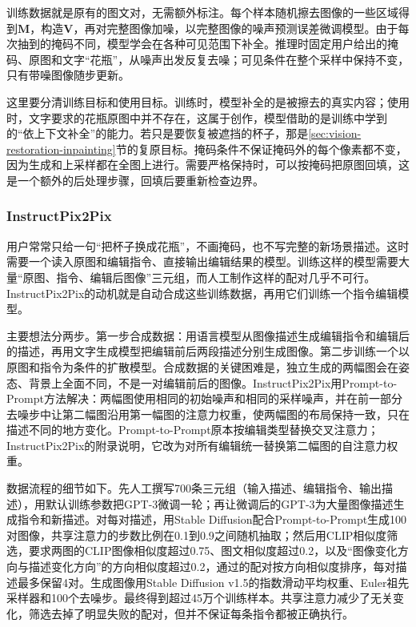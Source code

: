 训练数据就是原有的图文对，无需额外标注。每个样本随机擦去图像的一些区域得到$\bm{M}$，构造$\bm{V}$，再对完整图像加噪，以完整图像的噪声预测误差微调模型。由于每次抽到的掩码不同，模型学会在各种可见范围下补全。推理时固定用户给出的掩码、原图和文字“花瓶”，从噪声出发反复去噪；可见条件在整个采样中保持不变，只有带噪图像随步更新。

这里要分清训练目标和使用目标。训练时，模型补全的是被擦去的真实内容；使用时，文字要求的花瓶原图中并不存在，这属于创作，模型借助的是训练中学到的“依上下文补全”的能力。若只是要恢复被遮挡的杯子，那是\ref{sec:vision-restoration-inpainting}节的复原目标。掩码条件不保证掩码外的每个像素都不变，因为生成和上采样都在全图上进行。需要严格保持时，可以按掩码把原图回填，这是一个额外的后处理步骤，回填后要重新检查边界。

\subsubsection{InstructPix2Pix}
\label{sec:vision-generation-instruct-pix2pix}

用户常常只给一句“把杯子换成花瓶”，不画掩码，也不写完整的新场景描述。这时需要一个读入原图和编辑指令、直接输出编辑结果的模型。训练这样的模型需要大量“原图、指令、编辑后图像”三元组，而人工制作这样的配对几乎不可行。InstructPix2Pix的动机就是自动合成这些训练数据，再用它们训练一个指令编辑模型。

主要想法分两步。第一步合成数据：用语言模型从图像描述生成编辑指令和编辑后的描述，再用文字生成模型把编辑前后两段描述分别生成图像。第二步训练一个以原图和指令为条件的扩散模型。合成数据的关键困难是，独立生成的两幅图会在姿态、背景上全面不同，不是一对编辑前后的图像。InstructPix2Pix用Prompt-to-Prompt方法解决：两幅图使用相同的初始噪声和相同的采样噪声，并在前一部分去噪步中让第二幅图沿用第一幅图的注意力权重，使两幅图的布局保持一致，只在描述不同的地方变化。Prompt-to-Prompt原本按编辑类型替换交叉注意力；InstructPix2Pix的附录说明，它改为对所有编辑统一替换第二幅图的自注意力权重。

数据流程的细节如下。先人工撰写700条三元组（输入描述、编辑指令、输出描述），用默认训练参数把GPT-3微调一轮；再让微调后的GPT-3为大量图像描述生成指令和新描述。对每对描述，用Stable Diffusion配合Prompt-to-Prompt生成100对图像，共享注意力的步数比例在0.1到0.9之间随机抽取；然后用CLIP相似度筛选，要求两图的CLIP图像相似度超过0.75、图文相似度超过0.2，以及“图像变化方向与描述变化方向”的方向相似度超过0.2，通过的配对按方向相似度排序，每对描述最多保留4对。生成图像用Stable Diffusion v1.5的指数滑动平均权重、Euler祖先采样器和100个去噪步。最终得到超过45万个训练样本。共享注意力减少了无关变化，筛选去掉了明显失败的配对，但并不保证每条指令都被正确执行。

